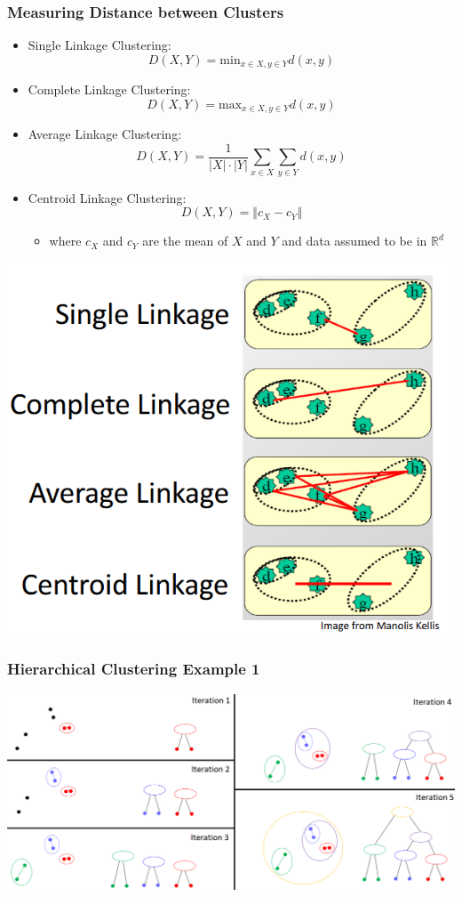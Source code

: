 \documentclass[10pt]{article}
\begin{document}
\subsubsection*{Measuring Distance between Clusters}
\begin{itemize}
    \item Single Linkage Clustering:
    \[D(X, Y) = \text{min}_{x \in X, y \in Y} d(x, y)\]
    \item Complete Linkage Clustering:
    \[D(X, Y) = \text{max}_{x \in X, y \in Y} d(x, y)\]
    \item Average Linkage Clustering:
    \[D(X, Y) = \frac{1}{|X| \cdot |Y|} \sum_{x \in X} \sum_{y \in Y} d(x, y)\]
    \item Centroid Linkage Clustering:
    \[D(X, Y) = \Vert c_X - c_Y\Vert\]
    \begin{itemize}
        \item where $c_X$ and $c_Y$ are the mean of $X$ and $Y$ and data assumed to be in $\mathbb{R}^d$
    \end{itemize}
\end{itemize}
\begin{center}
    \includegraphics[scale=0.6]{W6_8.png}
\end{center}

\subsubsection*{Hierarchical Clustering Example 1}
\begin{center}
    \includegraphics[width=\textwidth]{W6_9.png}
\end{center}
\end{document}
